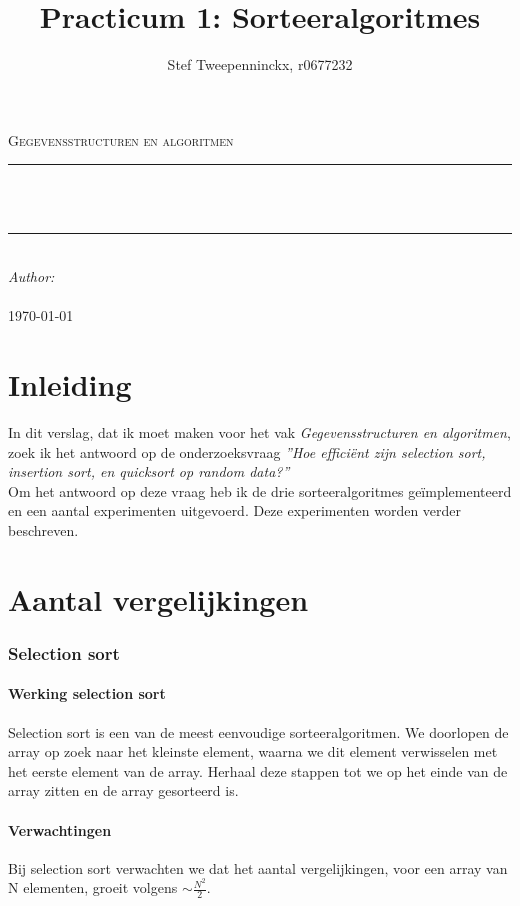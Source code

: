 \documentclass[11pt, a4paper]{article}
\author{Stef Tweepenninckx, r0677232}
\title{Practicum 1: Sorteeralgoritmes}
\makeatletter
\def\printtitle{                 
    {\large \@title}}
\def\printauthor{                  
    {\large \@author}}
\makeatother
\begin{document}
\begin{titlepage}
\newcommand{\HRule}{\rule{\linewidth}{0.5mm}} 
\center 
\textsc{\LARGE Gegevensstructuren en algoritmen}\\[1.5cm] 
\HRule \\[0.4cm]

{\huge \bfseries \printtitle}\\[0.4cm] 
\HRule \\[0.4cm]

\Large \emph{Author:}\\
 \textsc{\printauthor}\\[3cm]

{\large \textsc{\today}}\\[3cm] 

\vfill 
\end{titlepage}

\section*{Inleiding}
\indent In dit verslag, dat ik moet maken voor het vak \emph{Gegevensstructuren en algoritmen}, zoek ik het antwoord op de onderzoeksvraag \emph{''Hoe effici\"ent zijn selection sort, insertion sort, en quicksort op random data?''} \\
\indent Om het antwoord op deze vraag heb ik de drie sorteeralgoritmes ge\"implementeerd en een aantal experimenten uitgevoerd. Deze experimenten worden verder beschreven.

\newpage
\section*{Aantal vergelijkingen}
\subsubsection*{Selection sort}
\paragraph{Werking selection sort} Selection sort is een van de meest eenvoudige sorteeralgoritmen. We doorlopen de array op zoek naar het kleinste element, waarna we dit element verwisselen met het eerste element van de array. Herhaal deze stappen tot we op het einde van de array zitten en de array gesorteerd is.
\paragraph{Verwachtingen} Bij selection sort verwachten we dat het aantal vergelijkingen, voor een array van N elementen, groeit volgens $\sim \frac{N^2}{2}$.
\end{document}
